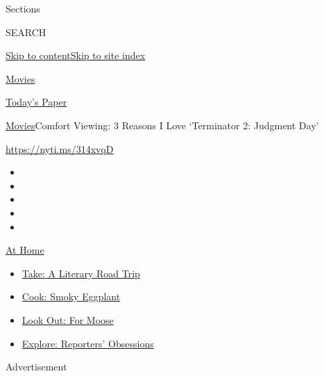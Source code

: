 Sections

SEARCH

\protect\hyperlink{site-content}{Skip to
content}\protect\hyperlink{site-index}{Skip to site index}

\href{https://www.nytimes.com/section/movies}{Movies}

\href{https://myaccount.nytimes.com/auth/login?response_type=cookie\&client_id=vi}{}

\href{https://www.nytimes.com/section/todayspaper}{Today's Paper}

\href{/section/movies}{Movies}\textbar{}Comfort Viewing: 3 Reasons I
Love `Terminator 2: Judgment Day'

\url{https://nyti.ms/314xvqD}

\begin{itemize}
\item
\item
\item
\item
\item
\end{itemize}

\href{https://www.nytimes.com/spotlight/at-home?action=click\&pgtype=Article\&state=default\&region=TOP_BANNER\&context=at_home_menu}{At
Home}

\begin{itemize}
\tightlist
\item
  \href{https://www.nytimes.com/2020/07/28/books/time-for-a-literary-road-trip.html?action=click\&pgtype=Article\&state=default\&region=TOP_BANNER\&context=at_home_menu}{Take:
  A Literary Road Trip}
\item
  \href{https://www.nytimes.com/2020/07/29/magazine/bored-with-your-home-cooking-some-smoky-eggplant-will-fix-that.html?action=click\&pgtype=Article\&state=default\&region=TOP_BANNER\&context=at_home_menu}{Cook:
  Smoky Eggplant}
\item
  \href{https://www.nytimes.com/2020/07/27/travel/moose-michigan-isle-royale.html?action=click\&pgtype=Article\&state=default\&region=TOP_BANNER\&context=at_home_menu}{Look
  Out: For Moose}
\item
  \href{https://www.nytimes.com/interactive/2020/at-home/even-more-reporters-editors-diaries-lists-recommendations.html?action=click\&pgtype=Article\&state=default\&region=TOP_BANNER\&context=at_home_menu}{Explore:
  Reporters' Obsessions}
\end{itemize}

Advertisement

